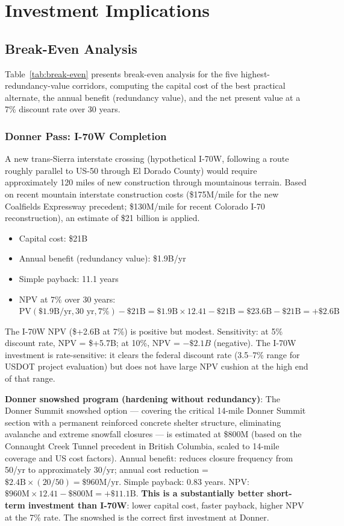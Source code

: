 \section{Investment Implications}

\subsection{Break-Even Analysis}

Table~\ref{tab:break-even} presents break-even analysis for the five highest-redundancy-value
corridors, computing the capital cost of the best practical alternate, the annual benefit
(redundancy value), and the net present value at a 7\% discount rate over 30 years.

\subsubsection{Donner Pass: I-70W Completion}

A new trans-Sierra interstate crossing (hypothetical I-70W, following a route roughly
parallel to US-50 through El Dorado County) would require approximately 120 miles of new
construction through mountainous terrain. Based on recent mountain interstate construction
costs (\$175M/mile for the new Coalfields Expressway precedent; \$130M/mile for recent
Colorado I-70 reconstruction), an estimate of \$21 billion is applied.

\begin{itemize}
\item Capital cost: \$21B
\item Annual benefit (redundancy value): \$1.9B/yr
\item Simple payback: 11.1 years
\item NPV at 7\% over 30 years: $\text{PV}(\$1.9\text{B}/\text{yr}, 30\text{ yr}, 7\%) -
\$21\text{B} = \$1.9\text{B} \times 12.41 - \$21\text{B} = \$23.6\text{B} - \$21\text{B}
= +\$2.6\text{B}$
\end{itemize}

The I-70W NPV (\$+2.6B at 7\%) is positive but modest. Sensitivity: at 5\% discount rate,
NPV = \$+5.7B; at 10\%, NPV = $-\$2.1B$ (negative). The I-70W investment is rate-sensitive:
it clears the federal discount rate (3.5--7\% range for USDOT project evaluation) but
does not have large NPV cushion at the high end of that range.

\textbf{Donner snowshed program (hardening without redundancy)}:
The Donner Summit snowshed option --- covering the critical 14-mile Donner Summit section
with a permanent reinforced concrete shelter structure, eliminating avalanche and extreme
snowfall closures --- is estimated at \$800M (based on the Connaught Creek Tunnel precedent
in British Columbia, scaled to 14-mile coverage and US cost factors). Annual benefit:
reduces closure frequency from 50/yr to approximately 30/yr; annual cost reduction =
$\$2.4\text{B} \times (20/50) = \$960\text{M/yr}$. Simple payback: 0.83 years. NPV:
$\$960\text{M} \times 12.41 - \$800\text{M} = +\$11.1\text{B}$. \textbf{This is a
substantially better short-term investment than I-70W}: lower capital cost, faster payback,
higher NPV at the 7\% rate. The snowshed is the correct first investment at Donner.

